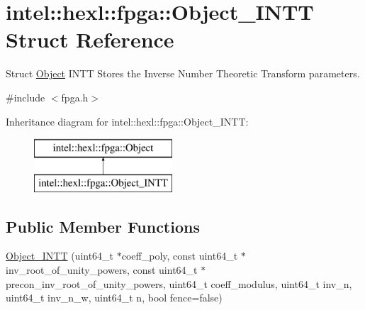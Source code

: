 \hypertarget{structintel_1_1hexl_1_1fpga_1_1Object__INTT}{\section{intel\-:\-:hexl\-:\-:fpga\-:\-:Object\-\_\-\-I\-N\-T\-T Struct Reference}
\label{structintel_1_1hexl_1_1fpga_1_1Object__INTT}
}


Struct \hyperlink{structintel_1_1hexl_1_1fpga_1_1Object}{Object} I\-N\-T\-T Stores the Inverse Number Theoretic Transform parameters.  




{\ttfamily \#include $<$fpga.\-h$>$}

Inheritance diagram for intel\-:\-:hexl\-:\-:fpga\-:\-:Object\-\_\-\-I\-N\-T\-T\-:\begin{figure}[H]
\begin{center}
\leavevmode
\includegraphics[height=2.000000cm]{structintel_1_1hexl_1_1fpga_1_1Object__INTT}
\end{center}
\end{figure}
\subsection*{Public Member Functions}
\begin{DoxyCompactItemize}
\item 
\hyperlink{structintel_1_1hexl_1_1fpga_1_1Object__INTT_ae22d0f99e890bde6201cbcb3eb4f0cd9}{Object\-\_\-\-I\-N\-T\-T} (uint64\-\_\-t $\ast$coeff\-\_\-poly, const uint64\-\_\-t $\ast$inv\-\_\-root\-\_\-of\-\_\-unity\-\_\-powers, const uint64\-\_\-t $\ast$precon\-\_\-inv\-\_\-root\-\_\-of\-\_\-unity\-\_\-powers, uint64\-\_\-t coeff\-\_\-modulus, uint64\-\_\-t inv\-\_\-n, uint64\-\_\-t inv\-\_\-n\-\_\-w, uint64\-\_\-t n, bool fence=false)
\end{DoxyCompactItemize}
